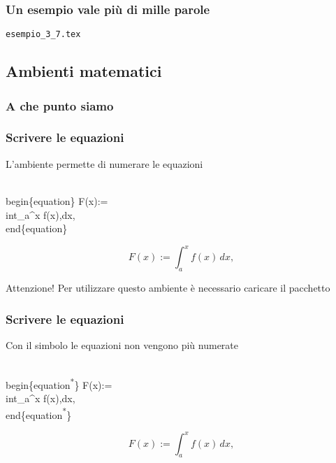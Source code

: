 \begin{frame}
  \frametitle{Un esempio vale pi\`u di mille parole}
	\begin{center}
		\alert{\texttt{esempio\_3\_7.tex}}
	\end{center}
\end{frame}
\subsection{Ambienti matematici}
\begin{frame}
  \frametitle{A che punto siamo}
\end{frame}
\begin{frame}
  \frametitle{Scrivere le equazioni}
	L'ambiente  permette di numerare le equazioni
	\begin{LaTeXcode}
		\alert{\\begin\{equation\}}\n
		\hspace*{5ex} F(x):= \\int\_a\textasciicircum x f(x)\bs,dx,\n
		\alert{\\end\{equation\}}
	\end{LaTeXcode}
	\begin{LaTeXoutput}
		\begin{equation}
			F(x):= \int_a^x f(x)\,dx,
		\end{equation}
	\end{LaTeXoutput}
	\begin{block}{Attenzione!}
		Per utilizzare questo ambiente \`e necessario caricare il pacchetto \Lsty{amsmath}
	\end{block}
\end{frame}
\begin{frame}
  \frametitle{Scrivere le equazioni}
	Con il simbolo \LCmd[]{\textsuperscript{*}} le equazioni non vengono pi\`u numerate
	\begin{LaTeXcode}
		\\begin\{equation\alert{\textsuperscript{*}}\}\n
		\hspace*{5ex} F(x):= \\int\_a\textasciicircum x f(x)\bs,dx,\n
		\\end\{equation\alert{\textsuperscript{*}}\}
	\end{LaTeXcode}
	\begin{LaTeXoutput}
		\begin{equation*}
			F(x):= \int_a^x f(x)\,dx,
		\end{equation*}
	\end{LaTeXoutput}
\end{frame}
